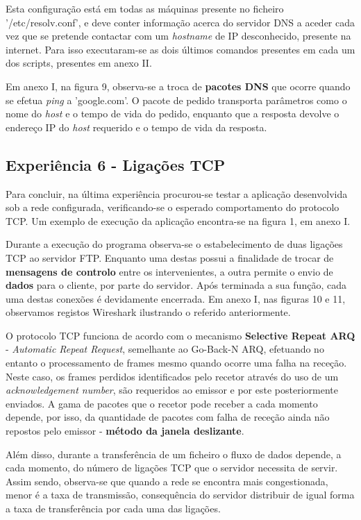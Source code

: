 \documentclass[a4paper, 11pt]{article}
\begin{document}
Esta configuração está em todas as máquinas presente no ficheiro '/etc/resolv.conf', e deve conter informação acerca do servidor DNS a aceder cada vez que se pretende contactar com um \textit{hostname} de IP desconhecido, presente na internet. Para isso executaram-se as dois últimos comandos presentes em cada um dos scripts, presentes em anexo II.

Em anexo I, na figura 9, observa-se a troca de \textbf{pacotes DNS} que ocorre quando se efetua \textit{ping} a 'google.com'. O pacote de pedido transporta parâmetros como o nome do \textit{host} e o tempo de vida do pedido, enquanto que a resposta devolve
o endereço IP do \textit{host} requerido e o tempo de vida da resposta.

\subsection{Experiência 6 - Ligações  TCP}
 
Para concluir, na última experiência procurou-se testar a aplicação desenvolvida sob a rede configurada, verificando-se o esperado comportamento do protocolo TCP. Um exemplo de execução da aplicação encontra-se na figura 1, em anexo I.

Durante a execução do programa observa-se o estabelecimento de duas ligações TCP ao servidor FTP. Enquanto uma destas possui a finalidade de trocar de \textbf{mensagens de controlo} entre os intervenientes, a outra permite o envio de \textbf{dados} para o cliente, por parte do servidor. Após terminada a sua função, cada uma destas conexões é devidamente encerrada. Em anexo I, nas figuras 10 e 11, observamos registos Wireshark ilustrando o referido anteriormente.

O protocolo TCP funciona de acordo com o mecanismo \textbf{Selective Repeat ARQ} - \textit{Automatic Repeat Request}, semelhante ao Go-Back-N ARQ, efetuando no entanto o processamento de frames mesmo quando ocorre uma falha na receção. Neste caso, os frames perdidos identificados pelo recetor através do uso de um \textit{acknowledgement number}, são requeridos ao emissor e por este posteriormente enviados. A gama de pacotes que o recetor pode receber a cada momento depende, por isso, da quantidade de pacotes com falha de receção ainda não repostos pelo emissor - \textbf{método da janela deslizante}.

Além disso, durante a transferência de um ficheiro o fluxo de dados depende, a cada momento, do número de ligações TCP que o servidor necessita de servir. Assim sendo, observa-se que quando a rede se encontra mais congestionada, menor é a taxa de transmissão, consequência do servidor distribuir de igual forma a taxa de transferência por cada uma das ligações. 
\end{document}
